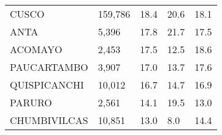 \begin{tabular}{lllll}
	\cellcolor[HTML]{FF5050}CUSCO                                  & 159,786                                                               & 18.4                                                                             & 20.6                                                                        & 18.1                                                                                \\
	\cellcolor[HTML]{FF5050}ANTA                                   & 5,396                                                                 & 17.8                                                                             & 21.7                                                                        & 17.5                                                                                \\
	\cellcolor[HTML]{FF5050}ACOMAYO                                & 2,453                                                                 & 17.5                                                                             & 12.5                                                                        & 18.6                                                                                \\
	\cellcolor[HTML]{FF5050}PAUCARTAMBO                            & 3,907                                                                 & 17.0                                                                             & 13.7                                                                        & 17.6                                                                                \\
	\cellcolor[HTML]{FF5050}QUISPICANCHI                           & 10,012                                                                & 16.7                                                                             & 14.7                                                                        & 16.9                                                                                \\
	\cellcolor[HTML]{FF5050}PARURO                                 & 2,561                                                                 & 14.1                                                                             & 19.5                                                                        & 13.0                                                                                \\
	\cellcolor[HTML]{FF5050}CHUMBIVILCAS                           & 10,851                                                                & 13.0                                                                             & 8.0                                                                         & 14.4                                                                                \\

\end{tabular}
